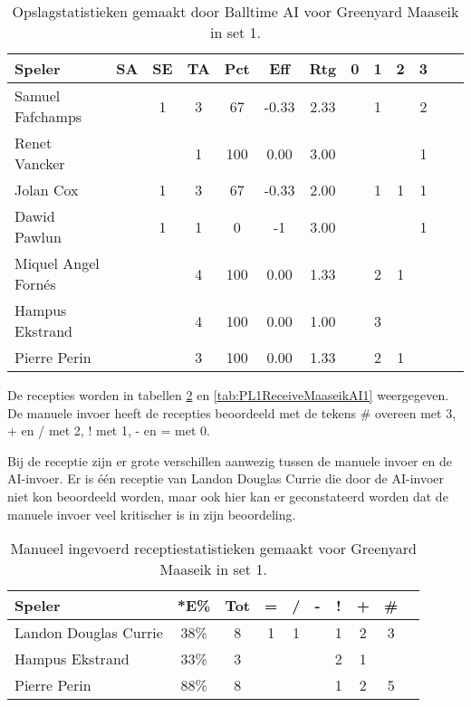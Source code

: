 \begin{table}[ht!]
  \centering
  \scriptsize
  \begin{tabular}{|l|c|c|c|c|c|c|c|c|c|c|c|c|} \hline
    \textbf{Speler} & SA & SE & TA & Pct & Eff & Rtg & 0 & 1 & 2 & 3 \\ \hline
    Samuel Fafchamps &  & 1 & 3 & 67 & -0.33 & 2.33 &  & 1 &  & 2  \\
    Renet Vancker &  &  & 1 & 100 & 0.00 & 3.00 &  &  &  & 1  \\
    Jolan Cox &  & 1 & 3 & 67 & -0.33 & 2.00 &  & 1 & 1 & 1 \\
    Dawid Pawlun &  & 1 & 1 & 0 & -1 & 3.00 &  &  &  & 1 \\
    Miquel Angel Fornés &  &  & 4 & 100 & 0.00 & 1.33 &  & 2 & 1 & \\
    Hampus Ekstrand &  &  & 4 & 100 & 0.00 & 1.00 &  & 3 &  & \\
    Pierre Perin &  &  & 3 & 100 & 0.00 & 1.33 &  & 2 & 1 & \\ \hline
  \end{tabular}
  \caption[Opslagstatistieken gemaakt door Balltime AI voor Greenyard Maaseik in set 1]{\label{tab:PL1ServeMaaseikAI1}Opslagstatistieken gemaakt door Balltime AI voor Greenyard Maaseik in set 1.}
\end{table}

De recepties worden in tabellen \ref{tab:PL1ReceiveMaaseikMan1} en \ref{tab:PL1ReceiveMaaseikAI1} weergegeven. De manuele invoer heeft de recepties beoordeeld met de tekens \# overeen met 3, + en / met 2, ! met 1, - en = met 0.

Bij de receptie zijn er grote verschillen aanwezig tussen de manuele invoer en de AI-invoer. Er is één receptie van Landon Douglas Currie die door de AI-invoer niet kon beoordeeld worden, maar ook hier kan er geconstateerd worden dat de manuele invoer veel kritischer is in zijn beoordeling. 

\begin{table}[ht!]
    \centering
    \scriptsize
    \begin{tabular}{|l|c|c|c|c|c|c|c|c|c|} \hline
        \textbf{Speler} & *E\% & Tot & = & / & - & ! & + & \# \\ \hline
        Landon Douglas Currie & 38\% & 8 & 1 & 1 &  & 1 & 2 & 3 \\ 
        Hampus Ekstrand & 33\% & 3 &  &  &  & 2 & 1 &  \\ 
        Pierre Perin & 88\% & 8 &  &  &  & 1 & 2 & 5  \\ \hline
    \end{tabular}
    \caption[Manueel ingevoerde receptiestatistieken gemaakt voor Greenyard Maaseik in set 1]{\label{tab:PL1ReceiveMaaseikMan1}Manueel ingevoerd receptiestatistieken gemaakt voor Greenyard Maaseik in set 1.}
\end{table}

